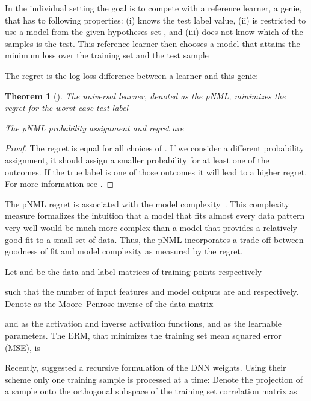 \documentclass{article}
\newtheorem{theorem}{Theorem}
\newcommand{\minisection}[1]{\vspace{2mm}\noindent{\textbf{#1.}}}
\begin{document}
\minisection{The genie} 
In the individual setting the goal is to compete with a reference learner, a genie, that has to following properties: (i) knows the test label value, (ii) is restricted to use a model from the given hypotheses set , and (iii) does not know which of the samples is the test. 
This reference learner then chooses a model that attains the minimum loss over the training set and the test sample

The regret is the log-loss difference between a learner  and this genie:
 


\begin{theorem}[\citet{fogel2018universal}]
\label{theroem:pnml}
The universal learner, denoted as the pNML, minimizes the regret for the worst case test label 

The pNML probability assignment and regret are

\end{theorem}
\begin{proof}
The regret is equal for all choices of . If we consider a different probability assignment, it should assign a smaller probability for at least one of the outcomes. If the true label is one of those outcomes it will lead to a higher regret. For more information see \citet{fogel2018universal}.
\end{proof}
The pNML regret is associated with the model complexity~\citep{zhang2012model}. This complexity measure formalizes the intuition that a model that fits almost every data pattern very well would be much more complex than a model that provides a relatively good fit to a small set of data.
Thus, the pNML incorporates a trade-off between goodness of fit and model complexity as measured by the regret.


\minisection{Online update of a neural network}
Let  and  be the data and label matrices of  training points respectively
 
such that the number of input features and model outputs are  and  respectively.
Denote  as the Moore–Penrose inverse of the data matrix

 and  as the activation and inverse activation functions, and  as the learnable parameters.
The ERM, that minimizes the training set mean squared error (MSE), is

Recently, \citet{zhuang2020training} suggested a recursive formulation of the DNN weights. Using their scheme only one training sample is processed at a time:
Denote the projection of a sample  onto the orthogonal subspace of the training set correlation matrix as
\end{document}
